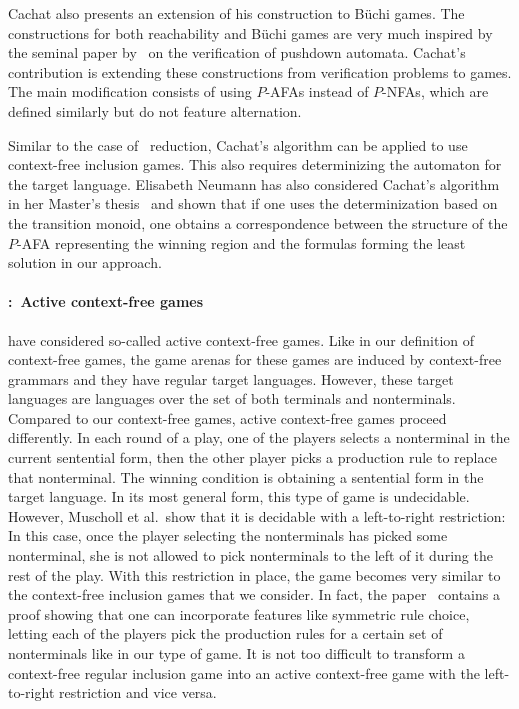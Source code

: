 \documentclass[../../diss.tex]{subfiles}
\begin{document}
Cachat also presents an extension of his construction to Büchi games.
The constructions for both reachability and Büchi games are very much inspired by the seminal paper by~ on the verification of pushdown automata.
Cachat's contribution is extending these constructions from verification problems to games.
The main modification consists of using $P$-AFAs instead of $P$-NFAs, which are defined similarly but do not feature alternation.

Similar to the case of \Walus~reduction, Cachat's algorithm can be applied to use context-free inclusion games.
This also requires determinizing the automaton for the target language.
Elisabeth Neumann has also considered Cachat's algorithm in her Master's thesis~\cite{Neumann17} and shown that if one uses the determinization based on the transition monoid, one obtains a correspondence between the structure of the $P$-AFA representing the winning region and the formulas forming the least solution in our approach.

\paragraph{\citeauthor{MuschollSS06}:~Active context-free games}

 have considered so-called active context-free games.
Like in our definition of context-free games, the game arenas for these games are induced by context-free grammars and they have regular target languages.
However, these target languages are languages over the set of both terminals and nonterminals.
Compared to our context-free games, active context-free games proceed differently.
In each round of a play, one of the players selects a nonterminal in the current sentential form, then the other player picks a production rule to replace that nonterminal.
The winning condition is obtaining a sentential form in the target language.
In its most general form, this type of game is undecidable.
However, Muscholl et al.~show that it is decidable with a left-to-right restriction:
In this case, once the player selecting the nonterminals has picked some nonterminal, she is not allowed to pick nonterminals to the left of it during the rest of the play.
With this restriction in place, the game becomes very similar to the context-free inclusion games that we consider.
In fact, the paper~\cite{MuschollSS06} contains a proof showing that one can incorporate features like symmetric rule choice, \ie letting each of the players pick the production rules for a certain set of nonterminals like in our type of game.
It is not too difficult to transform a context-free regular inclusion game into an active context-free game with the left-to-right restriction and vice versa.
\end{document}
